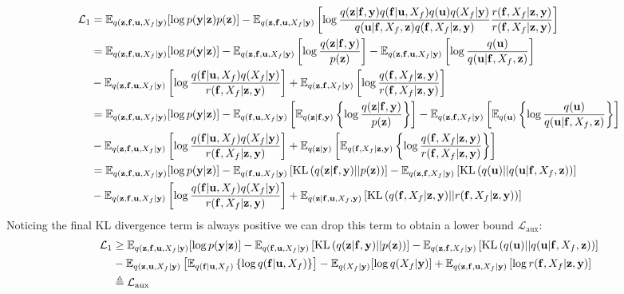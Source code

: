 \documentclass[12pt]{article}
\newcommand{\ub}{\mathbf{u}}
\newcommand{\zb}{\mathbf{z}}
\newcommand{\fb}{\mathbf{f}}
\newcommand{\yb}{\mathbf{y}}
\newcommand{\Lo}{\mathcal{L}_1}
\newcommand{\Laux}{\mathcal{L}_{\mathrm{aux}}}
\newcommand{\Ex}{\mathbb{E}}
\newcommand{\KL}{\mathrm{KL}}
\begin{document}
\begin{align}
\Lo &= \Ex_{q(\zb,\fb,\ub,X_f|\yb)}[\log p(\yb|\zb)p(\zb)] - \Ex_{q(\zb,\fb,\ub,X_f|\yb)}\left[\log\frac{q(\zb |\fb, \yb)q(\fb|\ub,X_f)q(\ub)q(X_f|\yb)}{q(\ub|\fb, X_f, \zb)q(\fb,X_f | \zb,\yb)} \frac{r(\fb,X_f|\zb,\yb)}{r(\fb,X_f|\zb,\yb)}\right] \\
&= \Ex_{q(\zb,\fb,\ub,X_f|\yb)}[\log p(\yb|\zb)] - \Ex_{q(\zb,\fb,\ub,X_f|\yb)}\left[\log\frac{q(\zb|\fb,\yb)}{p(\zb)}\right] - \Ex_{q(\zb,\fb,\ub,X_f|\yb)}\left[ \log\frac{q(\ub)}{q(\ub|\fb,X_f,\zb)} \right] \notag \\
&-\Ex_{q(\zb,\fb,\ub,X_f|\yb)}\left[\log\frac{q(\fb|\ub,X_f)q(X_f|\yb)}{r(\fb,X_f|\zb,\yb)}\right] + \Ex_{q(\zb,\fb,X_f|\yb)}\left[\log\frac{q(\fb,X_f|\zb,\yb)}{r(\fb,X_f|\zb,\yb)}\right] \\
&= \Ex_{q(\zb,\fb,\ub,X_f|\yb)}[\log p(\yb|\zb)] - \Ex_{q(\fb,\ub,X_f|\yb)}\left[\Ex_{q(\zb|\fb,\yb)}\left\{\log\frac{q(\zb|\fb,\yb)}{p(\zb)}\right\}\right] -\Ex_{q(\zb,\fb,X_f|\yb)}\left[\Ex_{q(\ub)}\left\{ \log\frac{q(\ub)}{q(\ub|\fb,X_f,\zb)} \right\}\right] \notag \\
&-\Ex_{q(\zb,\fb,\ub,X_f|\yb)}\left[\log\frac{q(\fb|\ub,X_f)q(X_f|\yb)}{r(\fb,X_f|\zb,\yb)}\right] + \Ex_{q(\zb|\yb)}\left[\Ex_{q(\fb,X_f|\zb,\yb)}\left\{\log\frac{q(\fb,X_f|\zb,\yb)}{r(\fb,X_f|\zb,\yb)}\right\}\right] \\
&= \Ex_{q(\zb,\fb,\ub,X_f|\yb)}[\log p(\yb|\zb)] - \Ex_{q(\fb,\ub,X_f|\yb)}\left[\KL\left(q(\zb|\fb,\yb)||p(\zb)\right)\right] -\Ex_{q(\zb,\fb,X_f|\yb)}\left[ \KL\left( q(\ub)||q(\ub|\fb,X_f,\zb) \right) \right] \notag \\
&-\Ex_{q(\zb,\fb,\ub,X_f|\yb)}\left[\log\frac{q(\fb|\ub,X_f)q(X_f|\yb)}{r(\fb,X_f|\zb,\yb)}\right] + \Ex_{q(\zb|\fb,\ub,X_f,\yb)}\left[\KL\left(q(\fb,X_f|\zb,\yb)||r(\fb,X_f|\zb,\yb)\right)\right]
\end{align}
%
Noticing the final KL divergence term is always positive we can drop this term to obtain a lower bound $\Laux:$
%
\begin{align}
\Lo &\ge \Ex_{q(\zb,\fb,\ub,X_f|\yb)}[\log p(\yb|\zb)] - \Ex_{q(\fb,\ub,X_f|\yb)}\left[\KL\left(q(\zb|\fb,\yb)||p(\zb)\right)\right] -\Ex_{q(\zb,\fb,X_f|\yb)}\left[ \KL\left( q(\ub)||q(\ub|\fb,X_f,\zb) \right) \right] \notag \\
&- \Ex_{q(\zb,\ub,X_f|\yb)}\left[ \Ex_{q(\fb|\ub,X_f)}\left\{\log q(\fb|\ub,X_f) \right\} \right] - \Ex_{q(X_f|\yb)}[\log q(X_f|\yb)] + \Ex_{q(\zb,\fb,\ub,X_f|\yb)}\left[ \log r(\fb,X_f|\zb,\yb) \right] \\
&\triangleq \Laux
\end{align}
%
\end{document}
